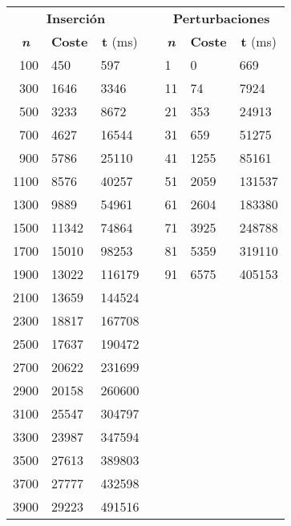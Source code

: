\documentclass[10pt, a4paper]{article}
\theoremstyle{theorem-style}
\theoremstyle{theorem-style}
\theoremstyle{definition-style}
\theoremstyle{remark-style}
\theoremstyle{example-style}
\theoremstyle{definition-style}
\theoremstyle{remark-style}
\begin{document}
\begin{table}[h]
\centering
\begin{tabular}{|r|l|l|l|l|l|l|}
\cline{1-3} \cline{5-7}
\multicolumn{3}{c}{\cellcolor[HTML]{4DB6AC}\textbf{Inserción}} & & \multicolumn{3}{c}{\cellcolor[HTML]{4DB6AC}\textbf{Perturbaciones}}\\
\cline{1-3} \cline{5-7}
\multicolumn{1}{c}{\cellcolor[HTML]{80CBC4}\textbf{\emph{n}}} & \multicolumn{1}{c}{\cellcolor[HTML]{80CBC4}\textbf{Coste}} & \multicolumn{1}{c}{\cellcolor[HTML]{80CBC4}\textbf{t} (ms)} & & \multicolumn{1}{c}{\cellcolor[HTML]{80CBC4}\textbf{\emph{n}}} & \multicolumn{1}{c}{\cellcolor[HTML]{80CBC4}\textbf{Coste}} & \multicolumn{1}{c}{\cellcolor[HTML]{80CBC4}\textbf{t} (ms)}\\
\cline{1-3} \cline{5-7}
100&450&597&&1&0&669\\
300&1646&3346&&11&74&7924\\
500&3233&8672&&21&353&24913\\
700&4627&16544&&31&659&51275\\
900&5786&25110&&41&1255&85161\\
1100&8576&40257&&51&2059&131537\\
1300&9889&54961&&61&2604&183380\\
1500&11342&74864&&71&3925&248788\\
1700&15010&98253&&81&5359&319110\\
1900&13022&116179&&91&6575&405153\\
\cline{5-7}
2100&13659&144524\\
2300&18817&167708\\
2500&17637&190472\\
2700&20622&231699\\
2900&20158&260600\\
3100&25547&304797\\
3300&23987&347594\\
3500&27613&389803\\
3700&27777&432598\\
3900&29223&491516\\
 \cline{1-3}

\end{tabular}
\end{table}
\end{document}
